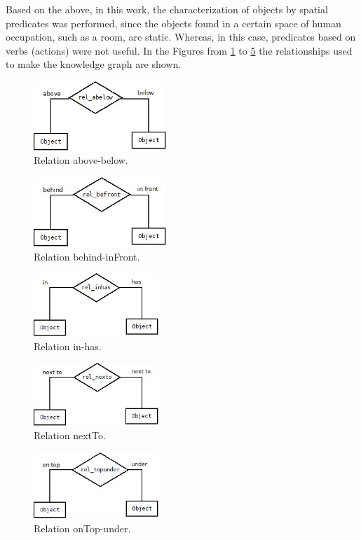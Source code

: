 Based on the above, in this work, the characterization of objects by spatial predicates was performed, since the objects found in a certain space of human occupation, such as a room, are static. Whereas, in this case, predicates based on verbs (actions) were not useful. In the Figures from \ref{fig:abelow} to \ref{fig:topUnder} the relationships used to make the knowledge graph are shown.
\begin{figure}[H]
    \centering
    \includegraphics[width=5cm]{figures/abelow.jpg}
    \caption{Relation above-below.}
    \label{fig:abelow}
\end{figure}
\begin{figure}[H]
    \centering
    \includegraphics[width=5cm]{figures/befront.jpg}
    \caption{Relation behind-inFront.}
    \label{fig:befront}
\end{figure}
\begin{figure}[H]
    \centering
    \includegraphics[width=4.7cm]{figures/inhas.jpg}
    \caption{Relation in-has.}
    \label{fig:inhas}
\end{figure}
\begin{figure}[H]
    \centering
    \includegraphics[width=4.7cm]{figures/nextto.jpg}
    \caption{Relation nextTo.}
    \label{fig:nexto}
\end{figure}
\begin{figure}[H]
    \centering
    \includegraphics[width=4.7cm]{figures/topunder.jpg}
    \caption{Relation onTop-under.}
    \label{fig:topUnder}
\end{figure}


